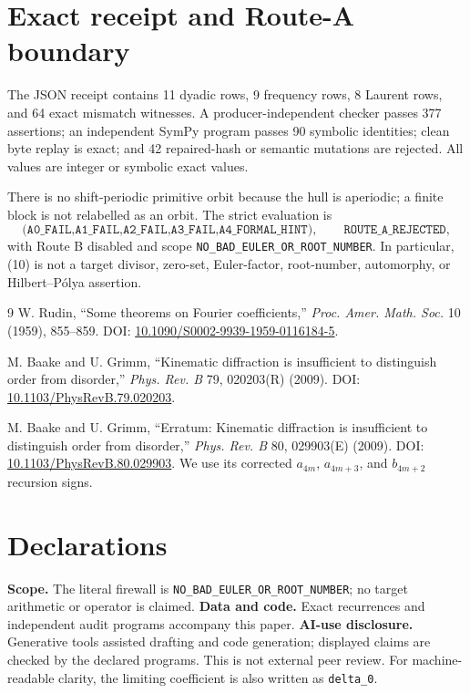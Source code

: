 \documentclass[10pt]{article}
\begin{document}
\section{Exact receipt and Route-A boundary}
The JSON receipt contains 11 dyadic rows, 9 frequency rows, 8 Laurent rows,
and 64 exact mismatch witnesses.  A producer-independent checker passes 377
assertions; an independent SymPy program passes 90 symbolic identities; clean
byte replay is exact; and 42 repaired-hash or semantic mutations are rejected.
All values are integer or symbolic exact values.

There is no shift-periodic primitive orbit because the hull is aperiodic; a
finite block is not relabelled as an orbit.  The strict evaluation is
\[
\texttt{(A0\_FAIL,A1\_FAIL,A2\_FAIL,A3\_FAIL,A4\_FORMAL\_HINT)},
\qquad\texttt{ROUTE\_A\_REJECTED},
\]
with Route B disabled and scope
\texttt{NO\_BAD\_EULER\_OR\_ROOT\_NUMBER}.  In particular, (10) is not a
target divisor, zero-set, Euler-factor, root-number, automorphy, or
Hilbert--P\'olya assertion.

\begin{thebibliography}{9}
W. Rudin, ``Some theorems on Fourier coefficients,'' \emph{Proc. Amer. Math.
Soc.} 10 (1959), 855--859. DOI:
\href{https://doi.org/10.1090/S0002-9939-1959-0116184-5}{10.1090/S0002-9939-1959-0116184-5}.

M. Baake and U. Grimm, ``Kinematic diffraction is insufficient to distinguish
order from disorder,'' \emph{Phys. Rev. B} 79, 020203(R) (2009). DOI:
\href{https://doi.org/10.1103/PhysRevB.79.020203}{10.1103/PhysRevB.79.020203}.

M. Baake and U. Grimm, ``Erratum: Kinematic diffraction is insufficient to
distinguish order from disorder,'' \emph{Phys. Rev. B} 80, 029903(E) (2009).
DOI: \href{https://doi.org/10.1103/PhysRevB.80.029903}{10.1103/PhysRevB.80.029903}.
We use its corrected $a_{4m}$, $a_{4m+3}$, and $b_{4m+2}$ recursion signs.
\end{thebibliography}

\section*{Declarations}
\textbf{Scope.} The literal firewall is
\texttt{NO\_BAD\_EULER\_OR\_ROOT\_NUMBER}; no target arithmetic or operator is
claimed.  \textbf{Data and code.} Exact recurrences and independent audit
programs accompany this paper.  \textbf{AI-use disclosure.} Generative tools
assisted drafting and code generation; displayed claims are checked by the
declared programs.  This is not external peer review.  For machine-readable
clarity, the limiting coefficient is also written as \texttt{delta\_0}.
\end{document}
